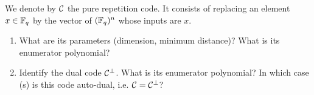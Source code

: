  
\begin{exo}
\label{exo-code-repetition}
 
We denote by $ \mathcal{C} $ the pure repetition code. It consists of replacing an element $ x \in \mathbb{F}_q $ by the vector of $ (\mathbb{F}_q)^n $ whose inputs are $ x $. \begin{enumerate}
\item What are its parameters (dimension, minimum distance)? What is its enumerator polynomial?
\item {}  Identify the dual code $ \mathcal{C}^\bot $. What is its enumerator polynomial? In which case (s) is this code auto-dual, i.e. $ \mathcal{C} = \mathcal{C}^\bot $?
\end{enumerate}
\end{exo}
 
 
\begin{exo}
\label{exo-codes-hadamard}
 

\end{exo}
